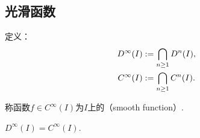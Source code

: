 \subsection{光滑函数}
\begin{definition}\label{definition:函数族.光滑函数族}
定义：\begin{gather*}
	D^\infty (I) := \bigcap_{n\geq1} D^n(I), \\
	C^\infty (I) := \bigcap_{n\geq1} C^n(I).
\end{gather*}

称函数\(f \in C^\infty (I)\)为\(I\)上的（smooth function）.
\end{definition}

\begin{property}\label{theorem:函数族.光滑函数族的性质1}
\(D^\infty (I) = C^\infty (I)\).
\end{property}
